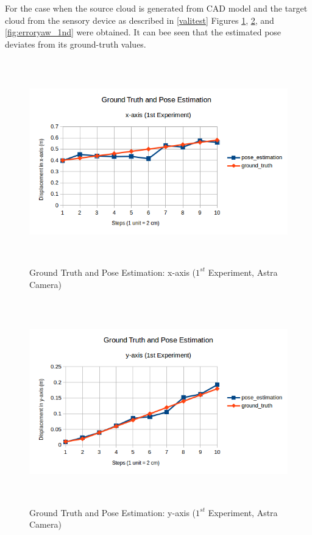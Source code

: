 For the case when the source cloud is generated from CAD model and the target cloud from the sensory device as described in \ref{valitest} Figures \ref{fig:errorx_1nd}, \ref{fig:errory_1nd}, and \ref{fig:erroryaw_1nd} were obtained. It can bee seen that the estimated pose deviates from its ground-truth values.
\begin{figure}[!h]
\begin{center}
\includegraphics[width=5in, height=3.5in]{figures05/1_x_validation.png}
\caption{Ground Truth and Pose Estimation: x-axis ($1^{st}$ Experiment, Astra Camera)}
\label{fig:errorx_1nd}
\end{center}
\end{figure}
\begin{figure}[!h]
\begin{center}
\includegraphics[width=5in, height=3.5in]{figures05/1_y_validation.png}
\caption{Ground Truth and Pose Estimation: y-axis ($1^{st}$ Experiment, Astra Camera)}
\label{fig:errory_1nd}
\end{center}
\end{figure}
